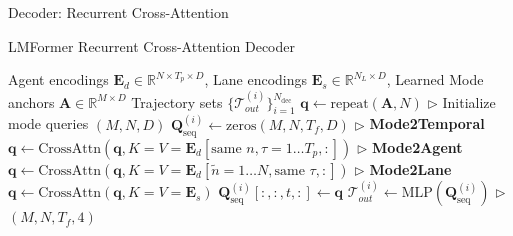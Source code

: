 \documentclass[10pt,aspectratio=169]{beamer}
\begin{document}
\begin{frame}[fragile]{Decoder: Recurrent Cross-Attention}
    \begin{block}{LMFormer Recurrent Cross-Attention Decoder}
    \begin{algorithmic}[1]
    \footnotesize
    \Require Agent encodings \(\mathbf{E}_d \in \mathbb{R}^{N \times T_{p} \times D}\), Lane encodings \(\mathbf{E}_s \in \mathbb{R}^{N_L \times D}\), Learned Mode anchors \(\mathbf{A} \in \mathbb{R}^{M \times D}\)
    \Ensure Trajectory sets \(\{\mathcal{T}_{out}^{(i)}\}_{i=1}^{N_{\text{dec}}}\)
    \State \(\mathbf{q} \leftarrow \text{repeat}(\mathbf{A}, N)\) \(\triangleright\) Initialize mode queries \((M, N, D)\)
        \State \(\mathbf{Q}_{\text{seq}}^{(i)} \leftarrow \text{zeros}(M, N, T_f, D)\)
            \State \(\triangleright\) \textbf{Mode2Temporal}
            \State \(\mathbf{q}\leftarrow \text{CrossAttn}(\mathbf{q}, K=V=\mathbf{E}_d[\text{same } n, \tau=1\dots T_p, :])\)
            \State \(\triangleright\) \textbf{Mode2Agent}
            \State \(\mathbf{q}\leftarrow \text{CrossAttn}(\mathbf{q}, K=V=\mathbf{E}_d[\tilde{n}=1\dots N, \text{same }\tau, :])\)
            \State \(\triangleright\) \textbf{Mode2Lane}
            \State \(\mathbf{q}\leftarrow \text{CrossAttn}(\mathbf{q}, K=V=\mathbf{E}_s)\)
            \State \(\mathbf{Q}_{\text{seq}}^{(i)}[:,:,t,:] \leftarrow \mathbf{q}\)
        \EndFor
        \State \(\mathcal{T}_{out}^{(i)} \leftarrow \text{MLP}(\mathbf{Q}_{\text{seq}}^{(i)})\) \(\triangleright\) \((M, N, T_f, 4)\)
    \EndFor
    \end{algorithmic}
    \end{block}
\end{frame}
\end{document}
